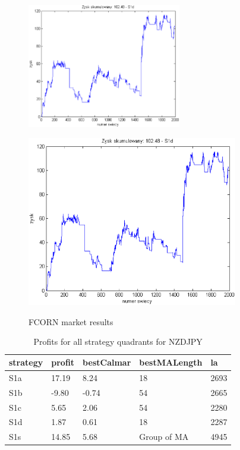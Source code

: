 \documentclass{tewiart}
\begin{document}
\begin{figure}[h]
\begin{minipage}{\linewidth}
\label{cztero}
\end{minipage}
\begin{minipage}{\linewidth}
\centering
\includegraphics[width=0.6\textwidth]{images/fcornS1d.eps}
\label{mansard}
\end{minipage}
\begin{minipage}{.49\linewidth}
\centering
\includegraphics[width=0.82\textwidth]{images/fcornS1s.eps}
\label{mansard}
\end{minipage}
\caption{FCORN market results}
\end{figure}
\newpage
\begin{table}[!t]
\caption{Profits for all strategy quadrants for NZDJPY}
 \begin{center}
 \begin{tabular}{|l|l|l|l|l|}
 \hline \textbf{strategy} & \textbf{profit} & \textbf{bestCalmar} & \textbf{bestMALength} & \textbf{la} \\ \hline
S1a & 17.19 & 8.24 & 18 & 2693\\ \hline
S1b & -9.80 & -0.74 & 54 & 2665\\ \hline
S1c & 5.65 & 2.06 & 54 & 2280\\ \hline
S1d & 1.87 & 0.61 & 18 & 2287\\ \hline
S1s & 14.85 & 5.68 & Group of MA & 4945\\
\hline \end{tabular}
 \end{center}
 \end{table}
\end{document}

